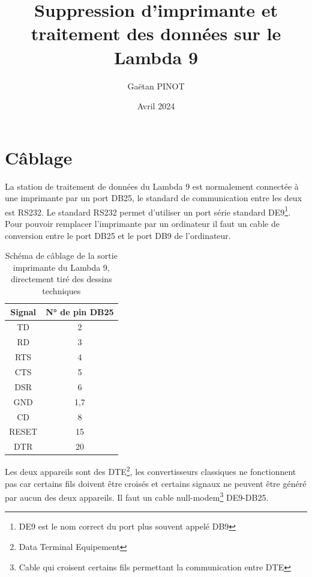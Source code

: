 \documentclass[a4paper, 12pt]{article}
\title{\Large\textbf{Suppression d'imprimante et traitement des données sur le Lambda 9}}
\author{Gaëtan PINOT}
\date{Avril 2024}
\begin{document}
\maketitle

\newpage


\section{Câblage}\label{cablage}


La station de traitement de données du Lambda 9 est normalement connectée à une imprimante par un port DB25, le standard de communication entre les deux est RS232.
Le standard RS232 permet d'utiliser un port série standard DE9\footnote{DE9 est le nom correct du port plus souvent appelé DB9 %
}.
Pour pouvoir remplacer l'imprimante par un ordinateur il faut un cable de conversion entre le port DB25 et le port DB9 de l'ordinateur.


\begin{table}[htb]
	\begin{tabular}{|c|c|}
		\hline
		Signal & N° de pin DB25 \\ \hline
		TD     & 2              \\ \hline
		RD     & 3              \\ \hline
		RTS    & 4              \\ \hline
		CTS    & 5              \\ \hline
		DSR    & 6              \\ \hline
		GND    & 1,7            \\ \hline
		CD     & 8              \\ \hline
		RESET  & 15             \\ \hline
		DTR    & 20             \\ \hline
	\end{tabular}
	\centering
	\caption{Schéma de câblage de la sortie imprimante du Lambda 9, directement tiré des dessins techniques}
	\label{table:pinoutLambda}
\end{table}

Les deux appareils sont des DTE\footnote{Data Terminal Equipement}, les convertisseurs classiques ne fonctionnent pas car certains fils doivent être croisés et certains signaux ne peuvent être généré par aucun des deux appareils.
Il faut un cable null-modem\footnote{Cable qui croisent certains fils permettant la communication entre DTE} DE9-DB25.
\end{document}
